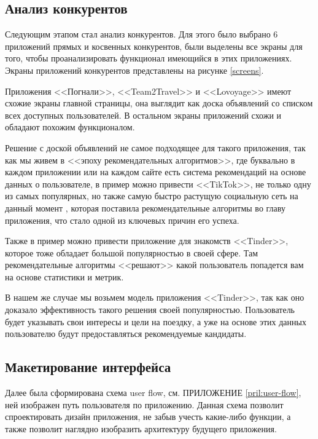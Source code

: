 \subsection{Анализ конкурентов}

Следующим этапом стал анализ конкурентов. Для этого было выбрано 6 приложений прямых и косвенных конкурентов, были выделены все экраны для того, чтобы проанализировать функционал имеющийся в этих приложениях. Экраны приложений конкурентов представлены на рисунке \ref{screens}.


Приложения <<Погнали>>, <<Team2Travel>> и <<Lovoyage>> имеют схожие экраны  главной страницы, она выглядит как доска объявлений со списком всех доступных пользователей. В остальном экраны приложений схожи и обладают похожим функционалом.

Решение с доской объявлений не самое подходящее для такого приложения, так как мы живем в <<эпоху рекомендательных алгоритмов>>, где буквально в каждом приложении или на каждом сайте есть система рекомендаций на основе данных о пользователе, в пример можно привести <<TikTok>>, не только одну из самых популярных, но также самую быстро растущую социальную сеть на данный момент \cite{tiktok-growth}, которая поставила рекомендательные алгоритмы во главу приложения, что стало одной из ключевых причин его успеха.

Также в пример можно привести приложение для знакомств <<Tinder>>, которое тоже обладает большой популярностью в своей сфере. Там рекомендательные алгоритмы <<решают>> какой пользователь попадется вам на основе статистики и метрик.

В нашем же случае мы возьмем модель приложения <<Tinder>>, так как оно доказало эффективность такого решения своей популярностью. Пользователь будет указывать свои интересы и цели на поездку, а уже на основе этих данных пользователю будут предоставляться рекомендуемые кандидаты.

\subsection{Макетирование интерфейса}

Далее была сформирована схема user flow, см. ПРИЛОЖЕНИЕ \ref{pril:user-flow}, ней изображен путь пользователя по приложению. Данная схема позволит спроектировать дизайн приложения, не забыв учесть какие-либо функции, а также позволит наглядно изобразить архитектуру будущего приложения.

